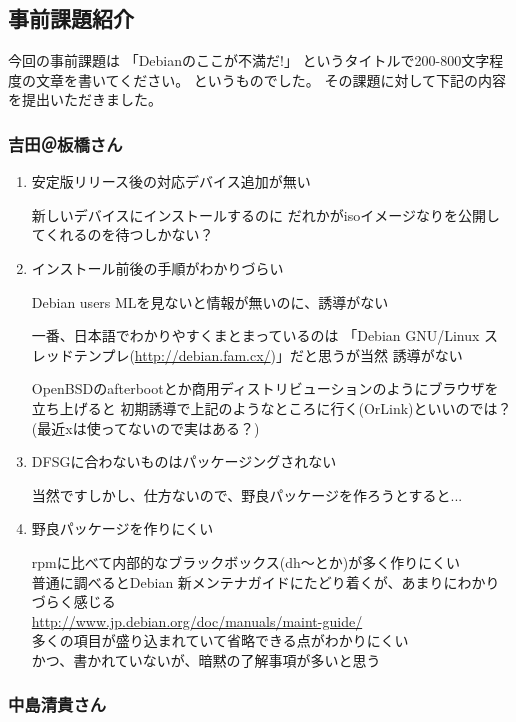 \documentclass[mingoth]{jsarticle}
\begin{document}
\subsection{事前課題紹介}

今回の事前課題は
「Debianのここが不満だ!」
というタイトルで200-800文字程度の文章を書いてください。
というものでした。
その課題に対して下記の内容を提出いただきました。

\subsubsection{吉田＠板橋さん}

\begin{enumerate}
 \item 
安定版リリース後の対応デバイス追加が無い

	新しいデバイスにインストールするのに
	だれかがisoイメージなりを公開してくれるのを待つしかない？

 \item インストール前後の手順がわかりづらい

	Debian users MLを見ないと情報が無いのに、誘導がない

	一番、日本語でわかりやすくまとまっているのは
	「Debian GNU/Linux スレッドテンプレ(\url{http://debian.fam.cx/})」だと思うが当然
	誘導がない

	OpenBSDのafterbootとか商用ディストリビューションのようにブラウザを立ち上げると
	初期誘導で上記のようなところに行く(OrLink)といいのでは？
	(最近xは使ってないので実はある？)

 \item 
DFSGに合わないものはパッケージングされない

	当然ですしかし、仕方ないので、野良パッケージを作ろうとすると...


 \item 野良パッケージを作りにくい

	rpmに比べて内部的なブラックボックス(dh〜とか)が多く作りにくい\\
	普通に調べるとDebian 新メンテナガイドにたどり着くが、あまりにわかりづらく感じる\\
	\url{http://www.jp.debian.org/doc/manuals/maint-guide/}\\
	多くの項目が盛り込まれていて省略できる点がわかりにくい\\
	かつ、書かれていないが、暗黙の了解事項が多いと思う\\
\end{enumerate}


\subsubsection{中島清貴さん}
\end{document}

